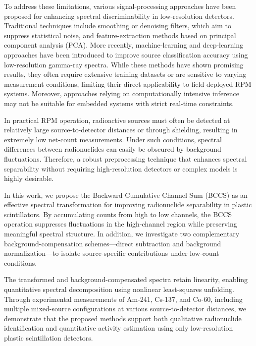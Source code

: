 \documentclass[10pt]{wlscirep}
\begin{document}
To address these limitations, various signal-processing approaches have been proposed for enhancing spectral discriminability in low-resolution detectors. Traditional techniques include smoothing or denoising filters\cite{Paff2017Spectral}, which aim to suppress statistical noise, and feature-extraction methods based on principal component analysis (PCA)\cite{Runkle2006Analysis,Kim2019InvMat}. More recently, machine-learning and deep-learning approaches have been introduced to improve source classification accuracy using low-resolution gamma-ray spectra\cite{Kim2019ANN,Lee2023Radionuclide,Jeon2021CompML}. While these methods have shown promising results, they often require extensive training datasets or are sensitive to varying measurement conditions, limiting their direct applicability to field-deployed RPM systems. Moreover, approaches relying on computationally intensive inference may not be suitable for embedded systems with strict real-time constraints.

In practical RPM operation, radioactive sources must often be detected at relatively large source-to-detector distances or through shielding, resulting in extremely low net-count measurements. Under such conditions, spectral differences between radionuclides can easily be obscured by background fluctuations. Therefore, a robust preprocessing technique that enhances spectral separability without requiring high-resolution detectors or complex models is highly desirable.

In this work, we propose the Backward Cumulative Channel Sum (BCCS) as an effective spectral transformation for improving radionuclide separability in plastic scintillators. By accumulating counts from high to low channels, the BCCS operation suppresses fluctuations in the high-channel region while preserving meaningful spectral structure. In addition, we investigate two complementary background-compensation schemes—direct subtraction and background normalization—to isolate source-specific contributions under low-count conditions.

The transformed and background-compensated spectra retain linearity, enabling quantitative spectral decomposition using nonlinear least-squares unfolding. Through experimental measurements of Am-241, Cs-137, and Co-60, including multiple mixed-source configurations at various source-to-detector distances, we demonstrate that the proposed methods support both qualitative radionuclide identification and quantitative activity estimation using only low-resolution plastic scintillation detectors.
\end{document}
